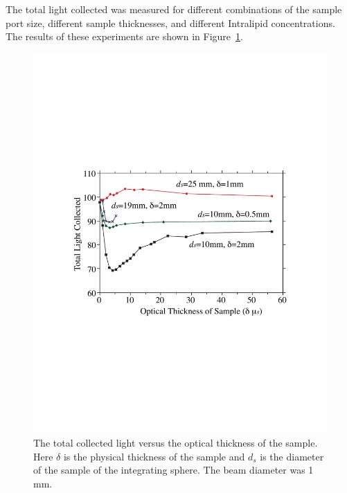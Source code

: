 \documentclass{article}
\begin{document}
The total light collected was measured for different combinations of the 
sample port size, different sample thicknesses, and different Intralipid
concentrations. The results of these experiments are shown in Figure~\ref{graph}.

\begin{figure}[b!]
\centering
\includegraphics[scale=0.600]{niek_graph.pdf}
\caption{The total collected light versus the optical thickness of the
sample.  Here $\delta$ is the physical thickness of the sample and $d_s$
is the diameter of the sample of the integrating sphere.
The beam diameter was 1\,mm.}
\label{graph}
\end{figure}
\end{document}
